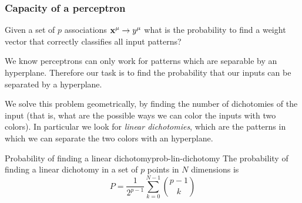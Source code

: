 \documentclass[12pt]{extarticle}
\renewcommand{\vec}[1]{\bvec{#1}}
\begin{document}
\subsubsection{Capacity of a perceptron}
Given a set of $p$ associations $\vec x^\mu \to y^\mu$ what is the probability to find
a weight vector that correctly classifies all input patterns?

We know perceptrons can only work for patterns which are separable by an hyperplane.
Therefore our task is to find the probability that our inputs can be separated by a hyperplane.

We solve this problem geometrically, by finding the number of dichotomies of the input (that is,
what are the possible ways we can color the inputs with two colors).
In particular we look for \emph{linear dichotomies}, which are the patterns in which we can separate
the two colors with an hyperplane.

\begin{proposition}{Probability of finding a linear dichotomy}{prob-lin-dichotomy}
	The probability of finding a linear dichotomy in a set of $p$ points in $N$ dimensions is
	\begin{equation}
		P = \frac{1}{2^{p-1}} \sum_{k = 0}^{N -1} \binom{p-1}{k}
		\label{eq:prob-lin-dichotomy}
	\end{equation}
\end{proposition}
\end{document}
